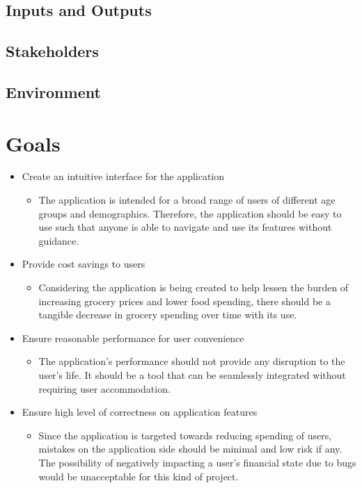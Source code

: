 \documentclass{article}
\begin{document}
\subsection{Inputs and Outputs}


\subsection{Stakeholders}

\subsection{Environment}


\section{Goals}

\begin{itemize}
  \item Create an intuitive interface for the application
  \begin{itemize}
    \item The application is intended for a broad range of users of different age groups
    and demographics. Therefore, the application should be easy to use such that anyone
    is able to navigate and use its features without guidance.
  \end{itemize}  
  \item Provide cost savings to users
  \begin{itemize}
    \item Considering the application is being created to help lessen the burden of increasing
    grocery prices and lower food spending, there should be a tangible decrease in grocery spending
    over time with its use.
  \end{itemize}
  \item Ensure reasonable performance for user convenience
  \begin{itemize}
    \item The application's performance should not provide any disruption to the user's life.
    It should be a tool that  can be seamlessly integrated without requiring user
    accommodation.
  \end{itemize} 
  \item Ensure high level of correctness on application features
  \begin{itemize}
    \item Since the application is targeted towards reducing spending of users, mistakes
    on the application side should be minimal and low risk if any. The possibility of negatively
    impacting a user's financial state due to bugs would be unacceptable for this kind of
    project.
  \end{itemize}  
\end{itemize}
\end{document}
